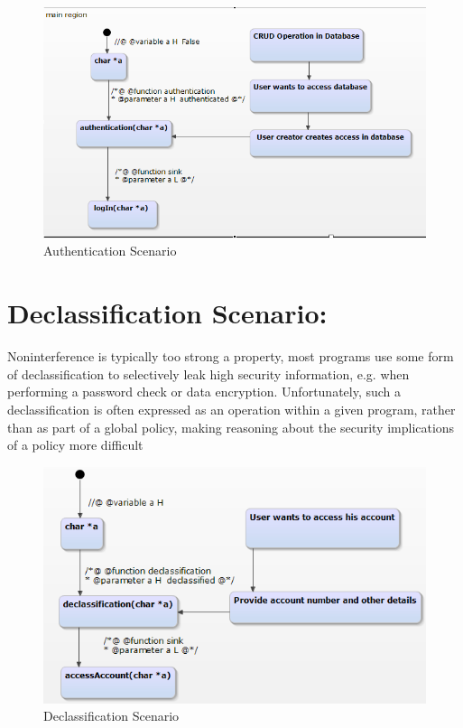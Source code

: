 \begin{figure}[htbp]
	\centering
	\includegraphics{styles/authentication_scenario.png}
	\caption{Authentication Scenario}
\end{figure}

\section{Declassification Scenario:}
 Noninterference is typically
 too strong a property, most programs use some form of declassification to selectively leak high security information, e.g. when performing a password check or data encryption. Unfortunately, such
 a declassification is often expressed as an operation within a given
 program, rather than as part of a global policy, making reasoning
 about the security implications of a policy more difficult
\begin{figure}[htbp]
	\centering
	\includegraphics{styles/declassification_scenario.png}
	\caption{Declassification Scenario}
\end{figure}
